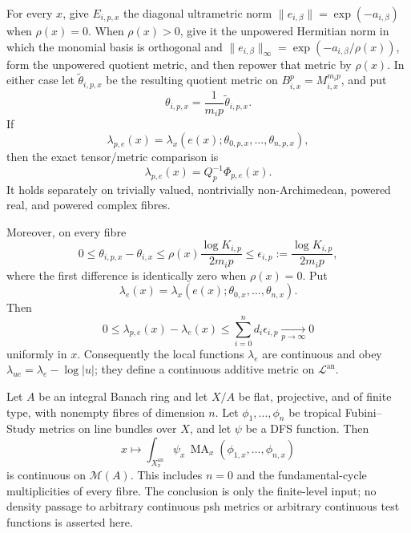 \begin{theorem}
For every \(x\), give \(E_{i,p,x}\) the diagonal ultrametric norm
\(\lVert e_{i,\beta}\rVert=\exp(-a_{i,\beta})\) when
\(\rho(x)=0\).  When \(\rho(x)>0\), give it the unpowered Hermitian norm
in which the monomial basis is orthogonal and
\(\lVert e_{i,\beta}\rVert_\infty
 =\exp(-a_{i,\beta}/\rho(x))\), form the unpowered quotient metric, and
then repower that metric by \(\rho(x)\).  In either case let
\(\widetilde\theta_{i,p,x}\) be the resulting quotient metric on
\(B_{i,x}^p=M_{i,x}^{m_ip}\), and put
\begin{equation}
 \theta_{i,p,x}=\frac1{m_ip}\widetilde\theta_{i,p,x}.
 \label{eq:p171-module-c-normalized-metric}
\end{equation}
If
\[
 \lambda_{p,e}(x)=
 \lambda_x(e(x);\theta_{0,p,x},\ldots,\theta_{n,p,x}),
\]
then the exact tensor/metric comparison is
\begin{equation}
 \boxed{\lambda_{p,e}(x)=Q_p^{-1}\Phi_{p,e}(x)}.
 \label{eq:p171-module-c-main-identity}
\end{equation}
It holds separately on trivially valued, nontrivially non-Archimedean,
powered real, and powered complex fibres.

Moreover, on every fibre
\begin{equation}
 0\leq\theta_{i,p,x}-\theta_{i,x}
 \leq\rho(x)\frac{\log K_{i,p}}{2m_ip}
 \leq\epsilon_{i,p}:=\frac{\log K_{i,p}}{2m_ip},
 \label{eq:p171-module-c-softmax}
\end{equation}
where the first difference is identically zero when \(\rho(x)=0\).  Put
\[
 \lambda_e(x)=
 \lambda_x(e(x);\theta_{0,x},\ldots,\theta_{n,x}).
\]
Then
\begin{equation}
 0\leq\lambda_{p,e}(x)-\lambda_e(x)
 \leq\sum_{i=0}^nd_i\epsilon_{i,p}\xrightarrow[p\to\infty]{}0
 \label{eq:p171-module-c-deligne-error}
\end{equation}
uniformly in \(x\).  Consequently the local functions \(\lambda_e\) are
continuous and obey
\(\lambda_{ue}=\lambda_e-\log\lvert u\rvert\); they define a continuous
additive metric on \(\mathscr L^{\mathrm{an}}\).
\end{theorem}

\begin{corollary}
\label{cor:p171-module-c-finite-level-continuity}
Let \(A\) be an integral Banach ring and let \(X/A\) be flat, projective,
and of finite type, with nonempty fibres of dimension \(n\).  Let
\(\phi_1,\ldots,\phi_n\) be tropical Fubini--Study metrics on line bundles
over \(X\), and let \(\psi\) be a DFS function.  Then
\begin{equation}
 x\longmapsto
 \int_{X_x^{\mathrm{an}}}\psi_x\,
 \operatorname{MA}_x(\phi_{1,x},\ldots,\phi_{n,x})
 \label{eq:p171-module-c-finite-level-function}
\end{equation}
is continuous on \(\mathcal M(A)\).  This includes \(n=0\) and the
fundamental-cycle multiplicities of every fibre.  The conclusion is only
the finite-level input; no density passage to arbitrary continuous psh
metrics or arbitrary continuous test functions is asserted here.
\end{corollary}
